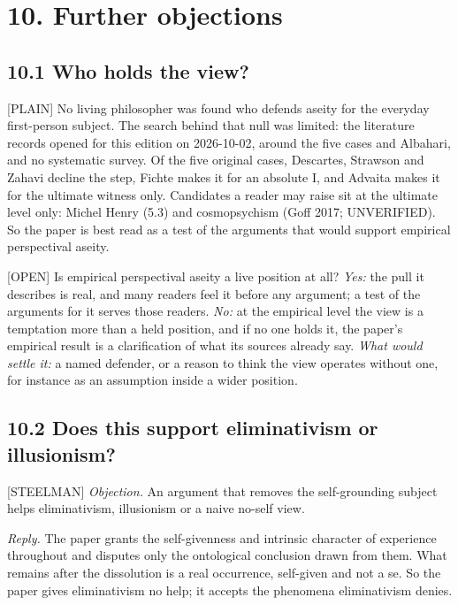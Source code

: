 \documentclass[11pt]{article}
\newcommand{\register}[1]{{\ttfamily\small #1}}
\begin{document}
\section*{10. Further objections}

\subsection*{10.1 Who holds the view?}

\register{[PLAIN]} No living philosopher was found who defends aseity for the everyday first-person subject. The search behind that null was limited: the literature records opened for this edition on 2026-10-02, around the five cases and Albahari, and no systematic survey. Of the five original cases, Descartes, Strawson and Zahavi decline the step, Fichte makes it for an absolute I, and Advaita makes it for the ultimate witness only. Candidates a reader may raise sit at the ultimate level only: Michel Henry (5.3) and cosmopsychism (Goff 2017; UNVERIFIED). So the paper is best read as a test of the arguments that would support empirical perspectival aseity.

\register{[OPEN]} Is empirical perspectival aseity a live position at all? \emph{Yes:} the pull it describes is real, and many readers feel it before any argument; a test of the arguments for it serves those readers. \emph{No:} at the empirical level the view is a temptation more than a held position, and if no one holds it, the paper's empirical result is a clarification of what its sources already say. \emph{What would settle it:} a named defender, or a reason to think the view operates without one, for instance as an assumption inside a wider position.

\subsection*{10.2 Does this support eliminativism or illusionism?}

\register{[STEELMAN]} \emph{Objection.} An argument that removes the self-grounding subject helps eliminativism, illusionism or a naive no-self view.

\emph{Reply.} The paper grants the self-givenness and intrinsic character of experience throughout and disputes only the ontological conclusion drawn from them. What remains after the dissolution is a real occurrence, self-given and not a se. So the paper gives eliminativism no help; it accepts the phenomena eliminativism denies.
\end{document}

